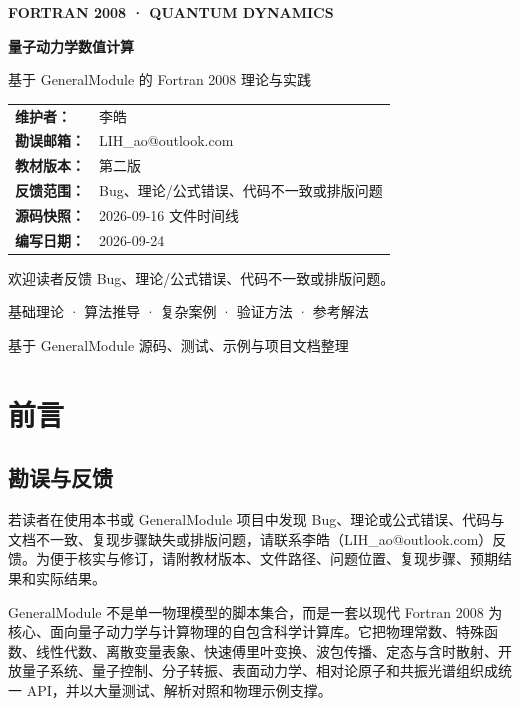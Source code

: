 \documentclass[UTF8,openany,11pt,fontset=fandol]{ctexbook}
\renewcommand{\arraystretch}{1.18}
\begin{document}
\begin{titlepage}
\centering
\vspace*{1.8cm}
{\Large\sffamily\bfseries\color{bookaccent} FORTRAN 2008 · QUANTUM DYNAMICS\par}
\vspace{1.0cm}
{\Huge\sffamily\bfseries 量子动力学数值计算\par}
\vspace{0.55cm}
{\Large\color{black!70} 基于 GeneralModule 的 Fortran 2008 理论与实践\par}
\vspace{1.6cm}
\begin{minipage}{0.78\textwidth}
\renewcommand{\arraystretch}{1.5}
\begin{tabular}{@{}>{\bfseries}p{}p{}@{}}
维护者： & 李皓\\
勘误邮箱： & LIH\_ao@outlook.com\\
教材版本： & 第二版\\
反馈范围： & Bug、理论/公式错误、代码不一致或排版问题\\
源码快照： & 2026-09-16 文件时间线\\
编写日期： & 2026-09-24
\end{tabular}
\end{minipage}
\vspace{0.4cm}
{\small\color{bookgray}欢迎读者反馈 Bug、理论/公式错误、代码不一致或排版问题。\par}
\vfill
{\large\color{bookgray}基础理论 · 算法推导 · 复杂案例 · 验证方法 · 参考解法\par}
\vspace{0.4cm}
{\small\color{bookgray}基于 GeneralModule 源码、测试、示例与项目文档整理\par}
\end{titlepage}
\frontmatter
\chapter*{前言}

\section*{勘误与反馈}
若读者在使用本书或 GeneralModule 项目中发现 Bug、理论或公式错误、代码与文档不一致、复现步骤缺失或排版问题，请联系李皓（LIH\_ao@outlook.com）反馈。为便于核实与修订，请附教材版本、文件路径、问题位置、复现步骤、预期结果和实际结果。

GeneralModule 不是单一物理模型的脚本集合，而是一套以现代 Fortran 2008
为核心、面向量子动力学与计算物理的自包含科学计算库。它把物理常数、特殊函数、线性代数、离散变量表象、快速傅里叶变换、波包传播、定态与含时散射、开放量子系统、量子控制、分子转振、表面动力学、相对论原子和共振光谱组织成统一
API，并以大量测试、解析对照和物理示例支撑。
\end{document}
